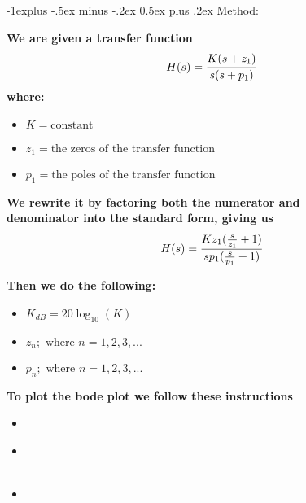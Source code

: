 \documentclass[10pt,landscape]{article}
\makeatletter
\renewcommand{\subsection}{\@startsection{subsection}{2}{0mm}%
                                {-1explus -.5ex minus -.2ex}%
                                {0.5ex plus .2ex}%
                                {\normalfont\normalsize\bfseries}}
\makeatother
\begin{document}
\begin{multicols}{3}
\subsection{Method:}

\textbf{We are given a transfer function} $$H(s) = \cfrac{K(s+z_1)}{s(s+p_1)}$$
\textbf{where:}  

\begin{itemize}
  \item $K = \text{constant}$ 
  \item $z_1 = \text{the zeros of the transfer function}$
  \item $p_1 = \text{the poles of the transfer function}$
\end{itemize}

\textbf{We rewrite it by factoring both the numerator and} \\ \textbf{denominator into the standard form, giving us} $$H(s) = \cfrac{K z_1(\frac{s}{z_1} + 1)}{s p_1(\frac{s}{p_1} + 1)}$$

\textbf{Then we do the following:}

\begin{itemize}
  \item {} $K_{dB} = 20 \log_{10} (K)$
  \item {} $z_n; \text{ where } n = 1, 2, 3,...$ 
  \item {} $p_n; \text{ where } n = 1, 2, 3,...$ 
\end{itemize}

\textbf{To plot the bode plot we follow these instructions}

\begin{itemize}
  \item {} \\ 
  \item {} \\  \\ 
  \item {} \\  \\ 
\end{itemize}


\end{multicols}
\end{document}

